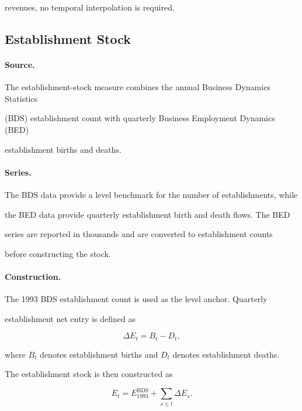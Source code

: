 \documentclass[11pt]{article}
\begin{document}
revenues, no temporal interpolation is required.



\subsection{Establishment Stock}

\paragraph{Source.}

The establishment-stock measure combines the annual Business Dynamics Statistics

(BDS) establishment count with quarterly Business Employment Dynamics (BED)

establishment births and deaths.

\paragraph{Series.}

The BDS data provide a level benchmark for the number of establishments, while

the BED data provide quarterly establishment birth and death flows. The BED

series are reported in thousands and are converted to establishment counts

before constructing the stock.

\paragraph{Construction.}

The 1993 BDS establishment count is used as the level anchor. Quarterly

establishment net entry is defined as

\begin{equation}
\Delta E_t
=
B_t-D_t,
\end{equation}

where $B_t$ denotes establishment births and $D_t$ denotes establishment deaths.

The establishment stock is then constructed as

\begin{equation}
E_t
=
E_{1993}^{\mathrm{BDS}}
+
\sum_{s\leq t}\Delta E_s.
\end{equation}
\end{document}
